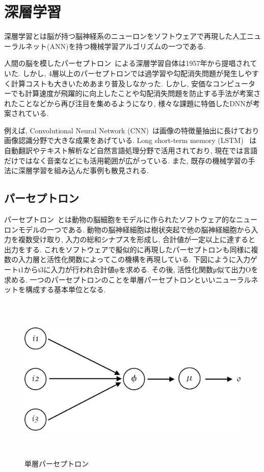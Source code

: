 \section{深層学習}

深層学習とは脳が持つ脳神経系のニューロンをソフトウェアで再現した人工ニューラルネット(ANN)を持つ機械学習アルゴリズムの一つである.

人間の脳を模したパーセプトロン~\cite{Perceptron}による深層学習自体は1957年から提唱されていた. しかし, 4層以上のパーセプトロンでは過学習や勾配消失問題が発生しやすく計算コストも大きいためあまり普及しなかった.
しかし, 安価なコンピューターでも計算速度が飛躍的に向上したことや勾配消失問題を防止する手法が考案されたことなどから再び注目を集めるようになり, 様々な課題に特価したDNNが考案されている.

例えば, Convolutional Neural Network (CNN)~\cite{CNN}は画像の特徴量抽出に長けており画像認識分野で大きな成果をあげている.
Long short-term memory (LSTM) ~\cite{LSTM}は自動翻訳やテキスト解析など自然言語処理分野で活用されており, 現在では言語だけではなく音楽などにも活用範囲が広がっている.
また, 既存の機械学習の手法に深層学習を組み込んだ事例も散見される.

\subsection{パーセプトロン}

パーセプトロン~\cite{Perceptron}とは動物の脳細胞をモデルに作られたソフトウェア的なニューロンモデルの一つである.
動物の脳神経細胞は樹状突起で他の脳神経細胞から入力を複数受け取り, 入力の総和シナプスを形成し, 合計値が一定以上に達すると出力をする. 
これをソフトウェアで擬似的に再現したパーセプトロンも同様に複数の入力層と活性化関数によってこの機構を再現している.
下図にように入力ゲートι1からι3に入力が行われ合計値φを求める. その後, 活性化関数μ似て出力Οを求める.
一つのパーセプトロンのことを単層パーセプトロンといいニューラルネットを構成する基本単位となる. 

\begin{figure}[H]
    \centering
    \includegraphics[clip,height = 8.0cm]{assets/Single_Perceptron.eps}
    \caption{単層パーセプトロン}  \label{sample}
\end{figure}




